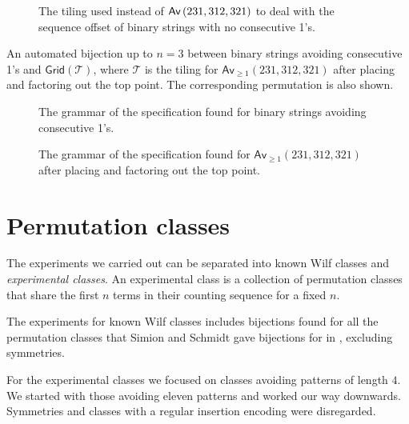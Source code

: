 \begin{figure}[ht!]
    \centering
    
    \caption{The tiling used instead of $\textsf{Av}\left(231,312,321\right)$ to deal with the sequence offset of binary strings with no consecutive 1's.}
    \label{fig:fibpermoffbyone}
\end{figure}

\begin{table}[ht!]
    \centering
    
    \caption{An automated bijection up to $n=3$ between binary strings avoiding consecutive 1's and $\textsf{Grid}(\mathcal{T})$, where $\mathcal{T}$ is the tiling for $\textsf{Av}_{\geq1}(231,312,321)$ after placing and factoring out the top point. The corresponding permutation is also shown.}
    \label{tab:wordtilmap}
\end{table}

\begin{figure}
    \centering
    
    \vspace*{-12.5mm}
    \caption{The grammar of the specification found for binary strings avoiding consecutive 1's.}
    \label{fig:fibwordtree}
\end{figure}
\begin{figure}
    \centering
    
    \vspace*{-14mm}
    \caption{The grammar of the specification found for $\textsf{Av}_{\geq1}(231,312,321)$ after placing and factoring out the top point.}
    \label{fig:fibpermtree}
\end{figure}

\section{Permutation classes}
The experiments we carried out can be separated into known Wilf classes and \emph{experimental classes}. An experimental class is a collection of permutation classes that share the first $n$ terms in their counting sequence for a fixed $n$.

The experiments for known Wilf classes includes bijections found for all the permutation classes that Simion and Schmidt gave bijections for in \cite{simionandschmidt}, excluding symmetries.

For the experimental classes we focused on classes avoiding patterns of length $4$. We started with those avoiding eleven patterns and worked our way downwards. Symmetries and classes with a regular insertion encoding were disregarded. 


